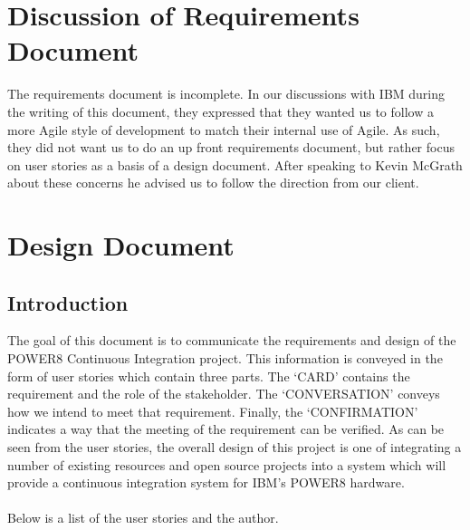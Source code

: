\documentclass[10pt,letterpaper,onecolumn,draftclsnofoot]{IEEEtran}
\begin{document}
\section{Discussion of Requirements Document}
The requirements document is incomplete. In our discussions with IBM during the writing of this
document, they expressed that they wanted us to follow a more Agile style of development to match
their internal use of Agile. As such, they did not want us to do an up front requirements document,
but rather focus on user stories as a basis of a design document. After speaking to Kevin McGrath
about these concerns he advised us to follow the direction from our client.

\clearpage
\section{Design Document}
\subsection{Introduction}
The goal of this document is to communicate the requirements and design of the POWER8 Continuous Integration project.
This information is conveyed in the form of user stories which contain three parts.
The `CARD' contains the requirement and the role of the stakeholder.
The `CONVERSATION' conveys how we intend to meet that requirement.
Finally, the `CONFIRMATION' indicates a way that the meeting of the requirement can be verified.
As can be seen from the user stories, the overall design of this project is one of integrating a number of existing resources and open source projects into a system which will provide a continuous integration system for IBM's POWER8 hardware.\\\\
Below is a list of the user stories and the author.\\
\end{document}
